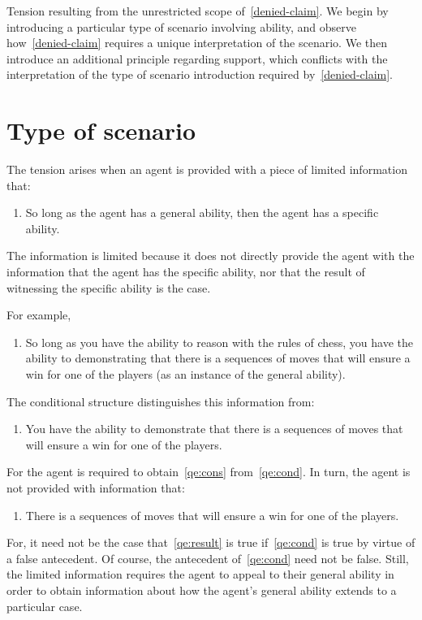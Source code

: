 \begin{note}[Overview]
  Tension resulting from the unrestricted scope of~\ref{denied-claim}.
  We begin by introducing a particular type of scenario involving ability, and observe how~\ref{denied-claim} requires a unique interpretation of the scenario.
  We then introduce an additional principle regarding support, which conflicts with the interpretation of the type of scenario introduction required by~\ref{denied-claim}.
\end{note}

\section{Type of scenario}
\label{sec:type-scenario}

\begin{note}
  The tension arises when an agent is provided with a piece of limited information that:
  \begin{enumerate}[label=(I\arabic*), ref=(I\arabic*)]
  \item So long as the agent has a general ability, then the agent has a specific ability.
  \end{enumerate}
  The information is limited because it does not directly provide the agent with the information that the agent has the specific ability, nor that the result of witnessing the specific ability is the case.

  For example,
  \begin{enumerate}[label=(I\arabic*), ref=(I\arabic*), resume]
  \item\label{qe:cond} So long as you have the ability to reason with the rules of chess, you have the ability to demonstrating that there is a sequences of moves that will ensure a win for one of the players (as an instance of the general ability).
  \end{enumerate}
  The conditional structure distinguishes this information from:
  \begin{enumerate}[label=(I\arabic*), ref=(I\arabic*), resume]
  \item\label{qe:cons} You have the ability to demonstrate that there is a sequences of moves that will ensure a win for one of the players.
  \end{enumerate}
  For the agent is required to obtain~\ref{qe:cons} from~\ref{qe:cond}.
  In turn, the agent is not provided with information that:
  \begin{enumerate}[label=(I\arabic*), ref=(I\arabic*), resume]
  \item\label{qe:result} There is a sequences of moves that will ensure a win for one of the players.
  \end{enumerate}
  For, it need not be the case that~\ref{qe:result} is true if~\ref{qe:cond} is true by virtue of a false antecedent.
  Of course, the antecedent of~\ref{qe:cond} need not be false.
  Still, the limited information requires the agent to appeal to their general ability in order to obtain information about how the agent's general ability extends to a particular case.


\end{note}
